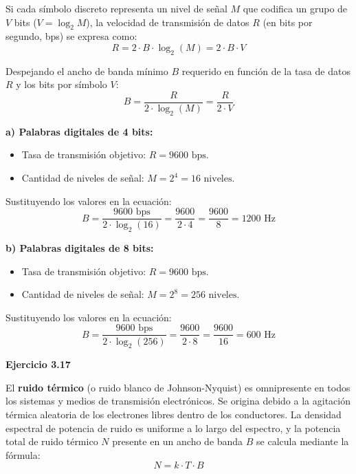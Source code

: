 \documentclass[11pt,a4paper]{article}
\begin{document}
Si cada símbolo discreto representa un nivel de señal $M$ que codifica un grupo de $V$ bits ($V = \log_2 M$), la velocidad de transmisión de datos $R$ (en bits por segundo, bps) se expresa como:
\begin{equation}
    R = 2 \cdot B \cdot \log_2(M) = 2 \cdot B \cdot V
\end{equation}

Despejando el ancho de banda mínimo $B$ requerido en función de la tasa de datos $R$ y los bits por símbolo $V$:
\begin{equation}
    B = \frac{R}{2 \cdot \log_2(M)} = \frac{R}{2 \cdot V}
\end{equation}

\vspace{0.2cm}

\noindent\textbf{a) Palabras digitales de 4 bits:}
\begin{itemize}
    \item Tasa de transmisión objetivo: $R = 9600\text{ bps}$.
    \item Cantidad de niveles de señal: $M = 2^4 = 16\text{ niveles}$.
\end{itemize}

Sustituyendo los valores en la ecuación:
\begin{equation}
    B = \frac{9600\text{ bps}}{2 \cdot \log_2(16)} = \frac{9600}{2 \cdot 4} = \frac{9600}{8} = 1200\text{ Hz}
\end{equation}

\noindent\textbf{b) Palabras digitales de 8 bits:}
\begin{itemize}
    \item Tasa de transmisión objetivo: $R = 9600\text{ bps}$.
    \item Cantidad de niveles de señal: $M = 2^8 = 256\text{ niveles}$.
\end{itemize}

Sustituyendo los valores en la ecuación:
\begin{equation}
    B = \frac{9600\text{ bps}}{2 \cdot \log_2(256)} = \frac{9600}{2 \cdot 8} = \frac{9600}{16} = 600\text{ Hz}
\end{equation}

\vspace{0.3cm}
\noindent\textbf{Ejercicio 3.17}\par
El \textbf{ruido térmico} (o ruido blanco de Johnson-Nyquist) es omnipresente en todos los sistemas y medios de transmisión electrónicos. Se origina debido a la agitación térmica aleatoria de los electrones libres dentro de los conductores.
La densidad espectral de potencia de ruido es uniforme a lo largo del espectro, y la potencia total de ruido térmico $N$ presente en un ancho de banda $B$ se calcula mediante la fórmula:
\begin{equation}
    N = k \cdot T \cdot B
\end{equation}
\end{document}
